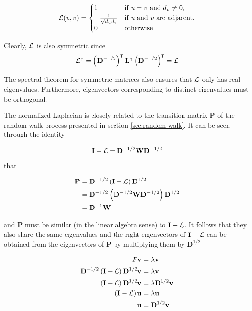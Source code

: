 \begin{align}
\mathbf{\mathcal{L}}(u,v) = 
\begin{cases}
1 & \text{if $u = v$ and $d_v \neq 0$,} \\
-\frac{1}{\sqrt{d_u d_v}} & \text{if $u$ and $v$ are adjacent,}\\
0 & \text{otherwise}
\end{cases}
\end{align}

Clearly, $\mathbf{\mathcal{L}}$ is also symmetric since
\begin{align}
\mathbf{\mathcal{L}}^\intercal = \left(\mathbf{D}^{-1/2} \right)^\intercal \mathbf{L}^\intercal \left( \mathbf{D}^{-1/2} \right)^\intercal = \mathbf{\mathcal{L}}
\end{align}

The spectral theorem for symmetric matrices \parencite{Watkins2010} also ensures that
$\mathbf{\mathcal{L}}$ only has real eigenvalues. Furthermore, eigenvectors corresponding to
distinct eigenvalues must be orthogonal.

The normalized Laplacian is closely related to the transition matrix $\mathbf{P}$ of the random
walk process presented in section \ref{sec:random-walk}. It can be seen through the
identity 

\begin{equation}
\mathbf{I} - \mathbf{\mathcal{L}} = \mathbf{D}^{-1/2} \mathbf{W} \mathbf{D}^{-1/2}
\end{equation}

that

\begin{align}
\mathbf{P} &= \mathbf{D}^{-1/2} \left( \mathbf{I} - \mathbf{\mathcal{L}} \right) \mathbf{D}^{1/2} \label{eq:rw-similarity} \\
 &= \mathbf{D}^{-1/2} \left( \mathbf{D}^{-1/2} \mathbf{W} \mathbf{D}^{-1/2} \right) \mathbf{D}^{1/2} \notag \\
 &= \mathbf{D}^{-1} \mathbf{W} \notag
\end{align}

and $\mathbf{P}$ must be similar (in the
linear algebra sense) to $\mathbf{I} - \mathbf{\mathcal{L}}$. It follows that they also share
the same eigenvalues and the right eigenvectors of $\mathbf{I} -\mathbf{\mathcal{L}}$ can be
obtained from the eigenvectors of $\mathbf{P}$ by multiplying them by $\mathbf{D}^{1/2}$

\begin{align}
P\mathbf{v} &= \lambda \mathbf{v} \notag \\
\mathbf{D}^{-1/2} \left( \mathbf{I} - \mathbf{\mathcal{L}} \right) \mathbf{D}^{1/2} \mathbf{v}  &= \lambda \mathbf{v} \notag \\
\left( \mathbf{I} - \mathbf{\mathcal{L}} \right) \mathbf{D}^{1/2} \mathbf{v}  &= \lambda \mathbf{D}^{1/2} \mathbf{v} \notag \\
\left( \mathbf{I} - \mathbf{\mathcal{L}} \right) \mathbf{u} &= \lambda \mathbf{u} \\
\mathbf{u} &= \mathbf{D}^{1/2} \mathbf{v}
\label{eq:similarity-rw}
\end{align}

